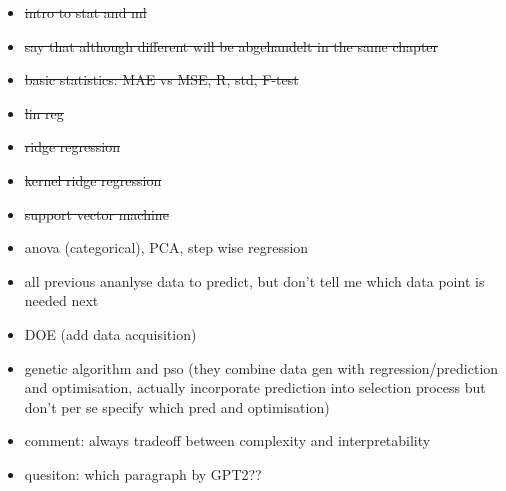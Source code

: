 \begin{itemize}
    \item \sout{intro to stat and ml}
    \item \sout{say that although different will be abgehandelt in the same chapter}
    \item \sout{basic statistics: MAE vs MSE, R, std, F-test} 
    \item \sout{lin reg}
    \item \sout{ridge regression}
    \item \sout{kernel ridge regression}
    \item \sout{support vector machine}
    \item anova (categorical), PCA, step wise regression
    \item all previous ananlyse data to predict, but don't tell me which data point is needed next 
    \item DOE (add data acquisition)
    \item genetic algorithm and pso (they combine data gen with regression/prediction and optimisation, actually incorporate prediction into selection process but don't per se specify which pred and optimisation)
    \item comment: always tradeoff between complexity and interpretability
    \item quesiton: which paragraph by GPT2?? 
\end{itemize}

